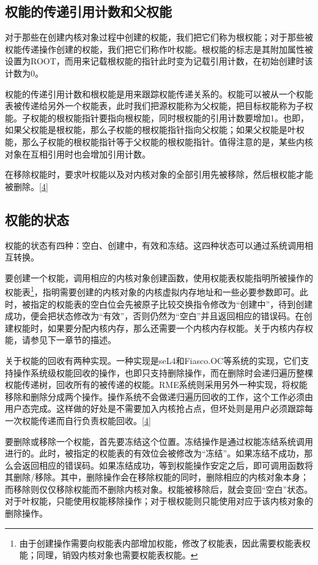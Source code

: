 \subsection{权能的传递引用计数和父权能}\label{subsec:2-reference-count-and-parent-capability}

对于那些在创建内核对象过程中创建的权能，我们把它们称为根权能；对于那些被权能传递操作创建的权能，我们把它们称作叶权能。根权能的标志是其附加属性被设置为ROOT，而用来记载根权能的指针此时变为记载引用计数，在初始创建时该计数为0。

权能的传递引用计数和根权能是用来跟踪权能传递关系的。权能可以被从一个权能表被传递给另外一个权能表，此时我们把源权能称为父权能，把目标权能称为子权能。子权能的根权能指针要指向根权能，同时根权能的引用计数要增加1。也即，如果父权能是根权能，那么子权能的根权能指针指向父权能；如果父权能是叶权能，那么子权能的根权能指针等于父权能的根权能指针。值得注意的是，某些内核对象在互相引用时也会增加引用计数。

在移除权能时，要求叶权能以及对内核对象的全部引用先被移除，然后根权能才能被删除。\hyperref[cite:2-4]{{[}4{]}}

\subsection{权能的状态}\label{subsec:2-capability-states}

权能的状态有四种：空白、创建中，有效和冻结。这四种状态可以通过系统调用相互转换。

要创建一个权能，调用相应的内核对象创建函数，使用权能表权能指明所被操作的权能表\footnote{由于创建操作需要向权能表内部增加权能，修改了权能表，因此需要权能表权能；同理，销毁内核对象也需要权能表权能。}，指明需要创建的内核对象的内核虚拟内存地址和一些必要参数即可。此时，被指定的权能表的空白位会先被原子比较交换指令修改为``创建中''，待到创建成功，便会把状态修改为``有效''，否则仍然为``空白''并且返回相应的错误码。在创建权能时，如果要分配内核内存，那么还需要一个内核内存权能。关于内核内存权能，请参见下一章节的描述。

关于权能的回收有两种实现。一种实现是seL4和Fiasco.OC等系统的实现，它们支持操作系统级权能回收的操作，也即只支持删除操作，而在删除时会递归遍历整棵权能传递树，回收所有的被传递的权能。RME系统则采用另外一种实现，将权能移除和删除分成两个操作。操作系统不会做递归遍历回收的工作，这个工作必须由用户态完成。这样做的好处是不需要加入内核抢占点，但坏处则是用户必须跟踪每一次权能传递而自行负责权能回收。\hyperref[cite:2-4]{{[}4{]}}

要删除或移除一个权能，首先要冻结这个位置。冻结操作是通过权能冻结系统调用进行的。此时，被指定的权能表的有效位会被修改为``冻结''。如果冻结不成功，那么会返回相应的错误码。如果冻结成功，等到权能操作安定之后，即可调用函数将其删除/移除。其中，删除操作会在移除权能的同时，删除相应的内核对象本身；而移除则仅仅移除权能而不删除内核对象。权能被移除后，就会变回``空白''状态。对于叶权能，只能使用权能移除操作；对于根权能则只能使用对应于该内核对象的删除操作。

